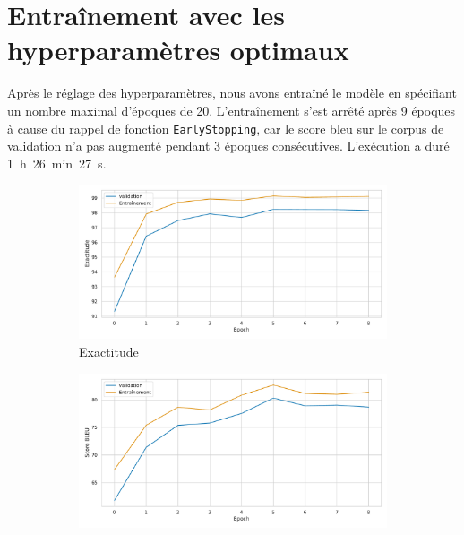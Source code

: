 \section{Entraînement avec les hyperparamètres optimaux}%
\label{sec.results.retrain}

Après le réglage des hyperparamètres, nous avons entraîné le modèle en spécifiant un nombre maximal d'époques de 20.
L'entraînement s'est arrêté après 9 époques à cause du rappel de fonction \verb|EarlyStopping|,
car le score \gls{bleu} sur le corpus de validation n'a pas augmenté pendant 3 époques consécutives.
L'exécution a duré 1~h~26~min~27~s.

\begin{figure}[!hbt]
    \begin{subfigure}{.5\textwidth}
        \caption{Exactitude}
        \begin{center}
            \includegraphics[width=\textwidth]{assets/python/tuned-accuracy.pdf}
        \end{center}
        \label{fig.results.tuned.training.accuracy}
    \end{subfigure}
    \begin{subfigure}{.5\textwidth}
        \caption{}
        \begin{center}
            \includegraphics[width=\textwidth]{assets/python/tuned-bleu.pdf}

\end{center}
\end{subfigure}
\end{figure}
